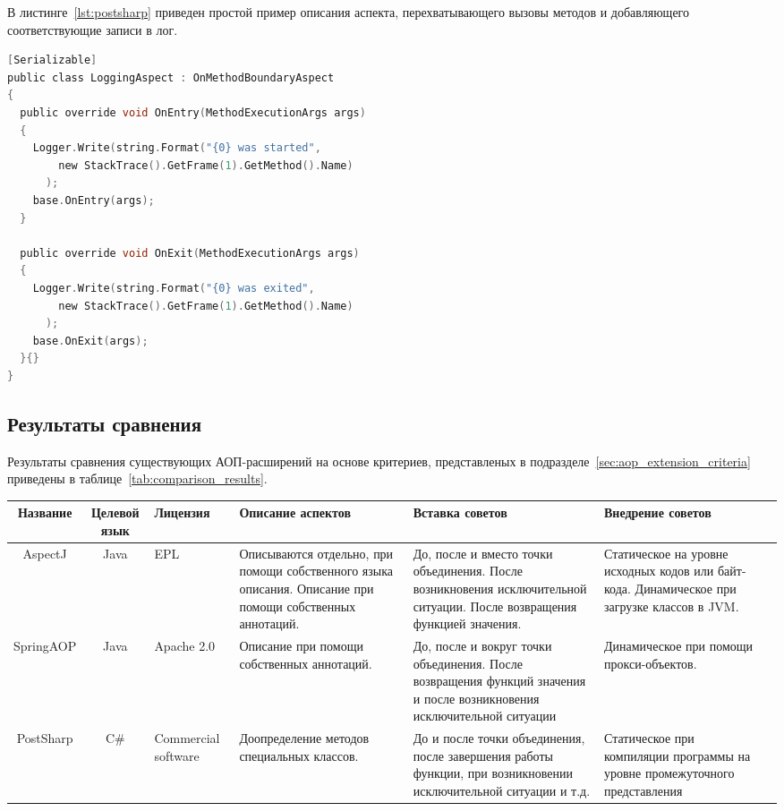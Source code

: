   В листинге~\ref{lst:postsharp} приведен простой пример описания аспекта, 
  перехватывающего вызовы методов и добавляющего соответствующие записи в лог.
  \begin{lstlisting}[language=C, label={lst:postsharp}, caption={Пример 
  описания аспекта при помощи PostSharp.}]
[Serializable]
public class LoggingAspect : OnMethodBoundaryAspect
{
  public override void OnEntry(MethodExecutionArgs args)
  {
    Logger.Write(string.Format("{0} was started",
        new StackTrace().GetFrame(1).GetMethod().Name)
      );
    base.OnEntry(args);
  }
 
  public override void OnExit(MethodExecutionArgs args)
  {
    Logger.Write(string.Format("{0} was exited",
        new StackTrace().GetFrame(1).GetMethod().Name)
      );
    base.OnExit(args);
  }{}
}
  \end{lstlisting}
\subsection{Результаты сравнения}
\label{sub:comparison_results}
Результаты сравнения существующих АОП-расширений на основе критериев,
представленых в подразделе~\ref{sec:aop_extension_criteria} приведены в
таблице~\ref{tab:comparison_results}.

\begin{sidewaystable}
\caption{Результаты сравнения существующих АОП-расширений}
\scriptsize
\begin{tabularx}{\textwidth}{|c|c|X|X|X|X|X|}
\hline
Название & Целевой язык & Лицензия & Описание аспектов & Вставка советов& Внедрение советов \\ \hline
AspectJ & Java & EPL & Описываются отдельно, при помощи собственного языка описания. Описание при помощи собственных аннотаций. & До, после и вместо точки объединения. После возникновения исключительной ситуации. После возвращения функцией значения. & Статическое на уровне исходных кодов или байт-кода. Динамическое при загрузке классов в JVM. \\ \hline
SpringAOP & Java & Apache 2.0 & Описание при помощи собственных аннотаций. & До, после и вокруг точки объединения. После возвращения функций значения и после возникновения исключительной ситуации & Динамическое при помощи прокси-объектов. \\ \hline
PostSharp & C\# & Commercial software & Доопределение методов специальных классов. & До и после точки объединения, после завершения работы функции, при возникновении исключительной ситуации и т.д. & Статическое при компиляции программы на уровне промежуточного представления \\ \hline
\end{tabularx}
\label{tab:comparison_results}
\end{sidewaystable}
